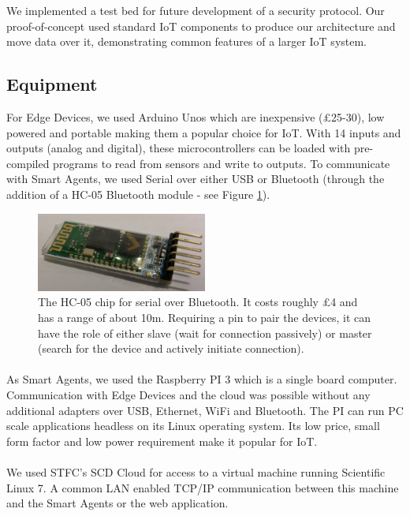 We implemented a test bed for future development of a security protocol. Our proof-of-concept used standard IoT components to produce our architecture and move data over it, demonstrating common features of a larger IoT system.

\subsection{Equipment}
For Edge Devices, we used Arduino Unos which are inexpensive (£25-30), low powered and portable making them a popular choice for IoT. With 14 inputs and outputs (analog and digital), these microcontrollers can be loaded with pre-compiled programs to read from sensors and write to outputs. To communicate with Smart Agents, we used Serial over either USB or Bluetooth (through the addition of a HC-05 Bluetooth module - see Figure \ref{fig:HC-05}).


\begin{figure}
    \centering
    \includegraphics[width=0.5\textwidth]{HC05.jpg}
    \caption{The HC-05 chip for serial over Bluetooth. It costs roughly £4 and has a range of about 10m. Requiring a pin to pair the devices, it can have the role of either slave (wait for connection passively) or master (search for the device and actively initiate connection).}
    \label{fig:HC-05}
\end{figure}

\paragraph{}
As Smart Agents, we used the Raspberry PI 3 which is a single board computer. Communication with Edge Devices and the cloud was possible without any additional adapters over USB, Ethernet, WiFi and Bluetooth. The PI can run PC scale applications headless on its Linux operating system. Its low price, small form factor and low power requirement make it popular for IoT.

\paragraph{}
We used STFC's SCD Cloud for access to a virtual machine running Scientific Linux 7. A common LAN enabled TCP/IP communication between this machine and the Smart Agents or the web application.

